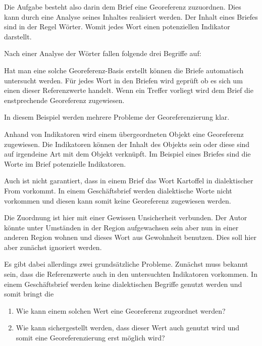 				Die Aufgabe besteht also darin dem Brief eine Georeferenz zuzuordnen. 
				Dies kann durch eine Analyse seines Inhaltes realisiert werden. 
				Der Inhalt eines Briefes sind in der Regel Wörter. 
				Womit jedes Wort einen potenziellen Indikator darstellt.

				Nach einer Analyse der Wörter fallen folgende drei Begriffe auf:

				

				Hat man eine solche Georeferenz-Basis erstellt können die Briefe automatisch untersucht werden.
				Für jedes Wort in den Briefen wird geprüft ob es sich um einen dieser Referenzwerte handelt. 
				Wenn ein Treffer vorliegt wird dem Brief die enstprechende Georeferenz zugewiesen.

				In diesem Beispiel werden mehrere Probleme der Georeferenzierung klar. 

				Anhand von Indikatoren wird einem übergeordneten Objekt eine Georeferenz zugewiesen. 
				Die Indikatoren können der Inhalt des Objekts sein oder diese sind auf irgendeine Art mit dem Objekt verknüpft.
				Im Beispiel eines Briefes sind die Worte im Brief potenzielle Indikatoren.



				Auch ist nicht garantiert, dass in einem Brief das Wort Kartoffel in dialektischer From vorkommt.
				In einem Geschäftsbrief werden dialektische Worte nicht vorkommen und diesen kann somit keine Georeferenz zugewiesen werden.


				Die Zuordnung ist hier mit einer Gewissen Unsicherheit verbunden. 
				Der Autor könnte unter Umständen in der Region aufgewachsen sein aber nun in einer anderen Region wohnen und dieses Wort aus Gewohnheit benutzen.
				Dies soll hier aber zunächst ignoriert werden. 


		
		
		Es gibt dabei allerdings zwei grundsätzliche Probleme.
		Zunächst muss bekannt sein, dass die Referenzwerte auch in den untersuchten Indikatoren vorkommen.
		In einem Geschäftsbrief werden keine dialektischen Begriffe genutzt werden und somit bringt die


		\begin{enumerate}
			\item Wie kann einem solchen Wert eine Georeferenz zugeordnet werden?
			\item Wie kann sichergestellt werden, dass dieser Wert auch genutzt wird und somit eine Georeferenzierung erst möglich wird?
		\end{enumerate}




